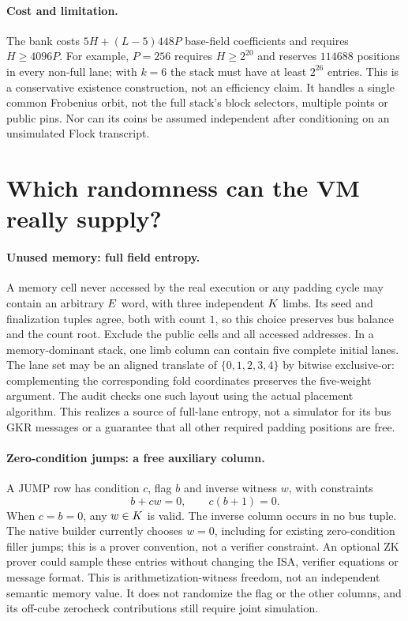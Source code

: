 \documentclass[11pt]{article}
\begin{document}
\paragraph{Cost and limitation.} The bank costs $5H+(L-5)448P$ base-field coefficients and requires $H\ge4096P$. For example, $P=256$ requires $H\ge2^{20}$ and reserves $114688$ positions in every non-full lane; with $k=6$ the stack must have at least $2^{26}$ entries. This is a conservative existence construction, not an efficiency claim. It handles a single common Frobenius orbit, not the full stack's block selectors, multiple points or public pins. Nor can its coins be assumed independent after conditioning on an unsimulated Flock transcript.

\section{Which randomness can the VM really supply?}

\paragraph{Unused memory: full field entropy.} A memory cell never accessed by the real execution or any padding cycle may contain an arbitrary $E$ word, with three independent $K$ limbs. Its seed and finalization tuples agree, both with count $1$, so this choice preserves bus balance and the count root. Exclude the public cells and all accessed addresses. In a memory-dominant stack, one limb column can contain five complete initial lanes. The lane set may be an aligned translate of $\{0,1,2,3,4\}$ by bitwise exclusive-or: complementing the corresponding fold coordinates preserves the five-weight argument. The audit checks one such layout using the actual placement algorithm. This realizes a source of full-lane entropy, not a simulator for its bus GKR messages or a guarantee that all other required padding positions are free.

\paragraph{Zero-condition jumps: a free auxiliary column.} A JUMP row has condition $c$, flag $b$ and inverse witness $w$, with constraints
\[
 b+cw=0,\qquad c(b+1)=0.
\]
When $c=b=0$, any $w\in K$ is valid. The inverse column occurs in no bus tuple. The native builder currently chooses $w=0$, including for existing zero-condition filler jumps; this is a prover convention, not a verifier constraint. An optional ZK prover could sample these entries without changing the ISA, verifier equations or message format. This is arithmetization-witness freedom, not an independent semantic memory value. It does not randomize the flag or the other columns, and its off-cube zerocheck contributions still require joint simulation.
\end{document}
